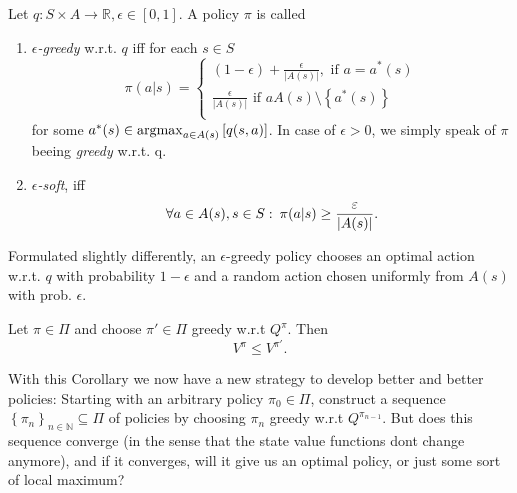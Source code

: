 \begin{definition}
    Let \( q: S \times A \to \mathbb{R}, \epsilon \in [0,1] \). A policy \( \pi \) is called 

    \begin{enumerate}
        \item \( \epsilon \)\emph{-greedy} w.r.t. \( q \) iff for each \( s \in S \)
        \[
            \pi(a|s) = \begin{cases}
                (1-\epsilon) + \frac{\epsilon}{|A(s)|}, \text{ if } a=a^*(s)\\
                \frac{\epsilon}{|A(s)|} \text{ if } a  A(s) \setminus \left\{ a^*(s) \right\}\\
            \end{cases}
        \]
        for some \( a^*(s) \in \operatorname*{argmax}_{ a \in A(s)} \left[ q(s,a) \right] \).
        In case of \( \epsilon> 0 \), we simply speak of \( \pi \) beeing \emph{greedy} w.r.t. q.
        \item \( \epsilon \)\emph{-soft}, iff
        \[
            \forall a \in A(s), s \in S:\: \pi(a|s) \geq \frac{\varepsilon}{|A(s)|}.
        \]
    \end{enumerate}
\end{definition}

Formulated slightly differently, an \( \epsilon \)-greedy policy chooses an optimal action w.r.t. \( q \) with probability \( 1-\epsilon \) and a random action  chosen uniformly from \( A(s) \) with prob. \( \epsilon \).

\begin{corollary}
         Let \( \pi \in \Pi \) and choose \( \pi' \in \Pi \) greedy w.r.t \( Q^\pi \). Then 
        \[
            V^\pi \leq V^{\pi'}.
        \]
\end{corollary}

With this Corollary we now have a new strategy to develop better and better policies:
Starting with an arbitrary policy \( \pi_{0} \in \Pi \), construct a sequence \( \left\{ \pi_n \right\}_{n \in \mathbb{N}} \subseteq \Pi \) of policies by choosing \( \pi_n \) greedy w.r.t \( Q^{\pi_{n-1}} \). But does this sequence converge (in the sense that the state value functions dont change anymore), and if it converges, will it give us an optimal policy, or just some sort of local maximum?  


